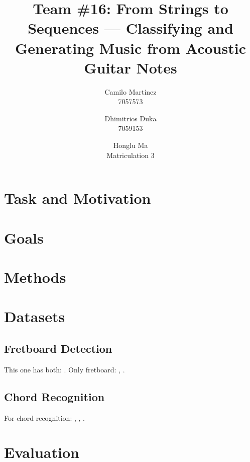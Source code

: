 \documentclass[10pt,twocolumn,letterpaper]{article}
\begin{document}
\title{Team \#16: From Strings to Sequences --- Classifying and Generating Music from Acoustic Guitar Notes}

\author{
Camilo Martínez\\
7057573\\
\and
Dhimitrios Duka\\
7059153\\
\and
Honglu Ma\\
Matriculation 3\\
}
\maketitle

\section{Task and Motivation}
\cite{Kristian_Zaman_Tenoyo_Jodhinata_2024}
\cite{du2023conditional}

\section{Goals}
\section{Methods}
\section{Datasets}

\subsection{Fretboard Detection}
This one has both: \cite{guitar-chords-daewp_dataset}. 
Only fretboard: \cite{guitar-ppfil_dataset}, \cite{done-npcll_dataset}.

\subsection{Chord Recognition}
For chord recognition: \cite{guitar-chord-tvon8_dataset}, \cite{guitar-chord-bounding-box_dataset}, \cite{guitar-chord-handshape_dataset}.

\section{Evaluation}


{\small


}
\end{document}
